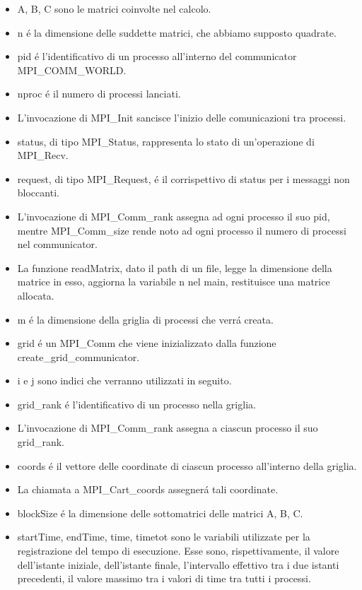 \begin{itemize}
    \item A, B, C sono le matrici coinvolte nel calcolo.
    \item n é la dimensione delle suddette matrici, che abbiamo supposto quadrate.
    \item pid é l'identificativo di un processo all'interno del communicator MPI\_COMM\_WORLD.
    \item nproc é il numero di processi lanciati.
    \item L'invocazione di MPI\_Init sancisce l'inizio delle comunicazioni tra processi.
    \item status, di tipo MPI\_Status, rappresenta lo stato di un'operazione di MPI\_Recv.
    \item request, di tipo MPI\_Request, é il corrispettivo di status per i messaggi non bloccanti.
    \item L'invocazione di MPI\_Comm\_rank assegna ad ogni processo il suo pid, mentre MPI\_Comm\_size rende noto ad ogni processo il numero di processi nel communicator.
    \item La funzione readMatrix, dato il path di un file, legge la dimensione della matrice in esso, aggiorna la variabile n nel main, restituisce una matrice allocata.
    \item m é la dimensione della griglia di processi che verrá creata.
    \item grid é un MPI\_Comm che viene inizializzato dalla funzione create\_grid\_communicator.
    \item i e j sono indici che verranno utilizzati in seguito.
    \item grid\_rank é l'identificativo di un processo nella griglia.
    \item L'invocazione di MPI\_Comm\_rank assegna a ciascun processo il suo grid\_rank.
    \item coords é il vettore delle coordinate di ciascun processo all'interno della griglia.
    \item La chiamata a MPI\_Cart\_coords assegnerá tali coordinate.
    \item blockSize é la dimensione delle sottomatrici delle matrici A, B, C.
    \item startTime, endTime, time, timetot sono le variabili utilizzate per la registrazione del tempo di esecuzione. Esse sono, rispettivamente, il valore dell'istante iniziale, dell'istante finale, l'intervallo effettivo tra i due istanti precedenti, il valore massimo tra i valori di time tra tutti i processi. 
\end{itemize}

